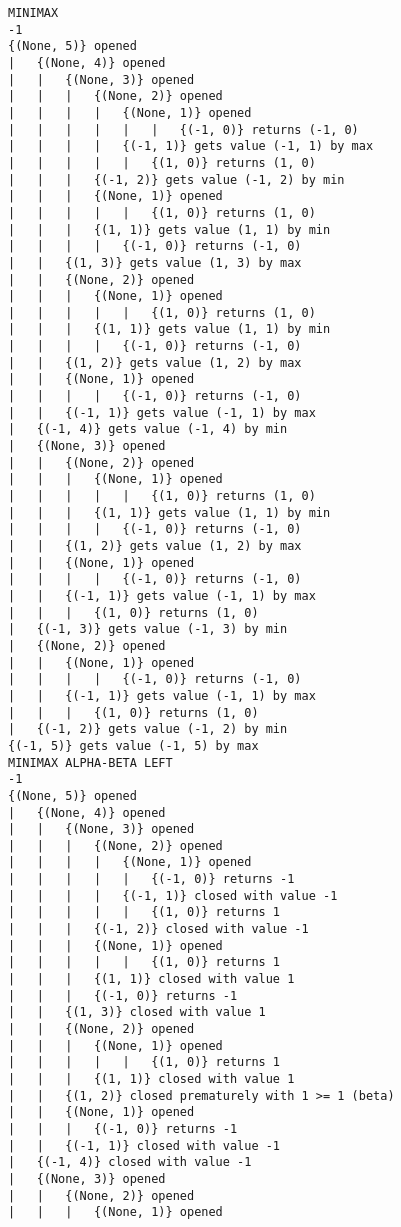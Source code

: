 \documentclass{article}
\begin{document}
\begin{verbatim}
MINIMAX
-1
{(None, 5)} opened
|   {(None, 4)} opened
|   |   {(None, 3)} opened
|   |   |   {(None, 2)} opened
|   |   |   |   {(None, 1)} opened
|   |   |   |   |   |   {(-1, 0)} returns (-1, 0)
|   |   |   |   {(-1, 1)} gets value (-1, 1) by max
|   |   |   |   |   {(1, 0)} returns (1, 0)
|   |   |   {(-1, 2)} gets value (-1, 2) by min
|   |   |   {(None, 1)} opened
|   |   |   |   |   {(1, 0)} returns (1, 0)
|   |   |   {(1, 1)} gets value (1, 1) by min
|   |   |   |   {(-1, 0)} returns (-1, 0)
|   |   {(1, 3)} gets value (1, 3) by max
|   |   {(None, 2)} opened
|   |   |   {(None, 1)} opened
|   |   |   |   |   {(1, 0)} returns (1, 0)
|   |   |   {(1, 1)} gets value (1, 1) by min
|   |   |   |   {(-1, 0)} returns (-1, 0)
|   |   {(1, 2)} gets value (1, 2) by max
|   |   {(None, 1)} opened
|   |   |   |   {(-1, 0)} returns (-1, 0)
|   |   {(-1, 1)} gets value (-1, 1) by max
|   {(-1, 4)} gets value (-1, 4) by min
|   {(None, 3)} opened
|   |   {(None, 2)} opened
|   |   |   {(None, 1)} opened
|   |   |   |   |   {(1, 0)} returns (1, 0)
|   |   |   {(1, 1)} gets value (1, 1) by min
|   |   |   |   {(-1, 0)} returns (-1, 0)
|   |   {(1, 2)} gets value (1, 2) by max
|   |   {(None, 1)} opened
|   |   |   |   {(-1, 0)} returns (-1, 0)
|   |   {(-1, 1)} gets value (-1, 1) by max
|   |   |   {(1, 0)} returns (1, 0)
|   {(-1, 3)} gets value (-1, 3) by min
|   {(None, 2)} opened
|   |   {(None, 1)} opened
|   |   |   |   {(-1, 0)} returns (-1, 0)
|   |   {(-1, 1)} gets value (-1, 1) by max
|   |   |   {(1, 0)} returns (1, 0)
|   {(-1, 2)} gets value (-1, 2) by min
{(-1, 5)} gets value (-1, 5) by max
MINIMAX ALPHA-BETA LEFT
-1
{(None, 5)} opened
|   {(None, 4)} opened
|   |   {(None, 3)} opened
|   |   |   {(None, 2)} opened
|   |   |   |   {(None, 1)} opened
|   |   |   |   |   {(-1, 0)} returns -1
|   |   |   |   {(-1, 1)} closed with value -1
|   |   |   |   |   {(1, 0)} returns 1
|   |   |   {(-1, 2)} closed with value -1
|   |   |   {(None, 1)} opened
|   |   |   |   |   {(1, 0)} returns 1
|   |   |   {(1, 1)} closed with value 1
|   |   |   {(-1, 0)} returns -1
|   |   {(1, 3)} closed with value 1
|   |   {(None, 2)} opened
|   |   |   {(None, 1)} opened
|   |   |   |   |   {(1, 0)} returns 1
|   |   |   {(1, 1)} closed with value 1
|   |   {(1, 2)} closed prematurely with 1 >= 1 (beta)
|   |   {(None, 1)} opened
|   |   |   {(-1, 0)} returns -1
|   |   {(-1, 1)} closed with value -1
|   {(-1, 4)} closed with value -1
|   {(None, 3)} opened
|   |   {(None, 2)} opened
|   |   |   {(None, 1)} opened

\end{verbatim}
\end{document}
